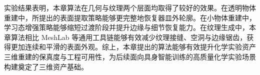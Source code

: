 实验结果表明，本章算法在几何与纹理两个层面均取得了较好的效果。在透明物体重建中，所提出的表面提取策略能够更完整地恢复器皿外轮廓。在小物体重建中，学习态增强策略能够缩短过渡阶段并提升边缘与细节恢复能力。在纹理生成中，本章算法相比 MeshLab 等通用工具链能够有效减少纹理接缝、空洞与边缘锯齿，获得更加连续和平滑的表面外观。综上，本章提出的算法能够有效提升化学实验资产三维重建的保真度与工程可用性，为后续面向具身智能训练的高质量化学实验场景构建奠定了三维资产基础。


